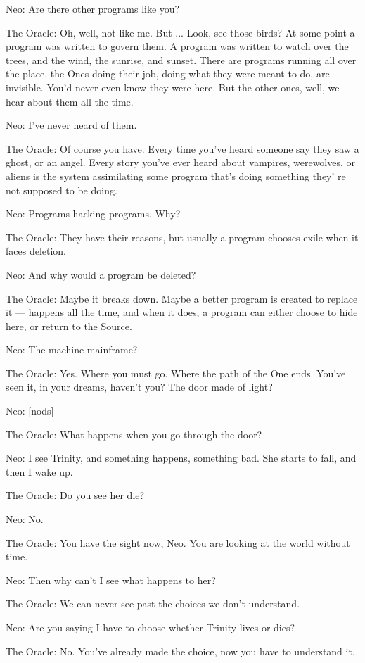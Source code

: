\documentclass[UTF8]{ctexart}
\newenvironment{myquote}{\color{green} \setlength{\leftskip}{6em} \setlength{\rightskip}{4em} \setlength{\parindent}{-2em}}{\par}
\begin{document}
\begin{myquote}
Neo: Are there other programs like you?

The Oracle: Oh, well, not like me. But ... Look, see those birds? At some point a program was written to govern them. A program was written to watch over the trees, and the wind, the sunrise, and sunset. There are programs running all over the place. the Ones doing their job, doing what they were meant to do, are invisible. You'd never even know they were here. But the other ones, well, we hear about them all the time.

Neo: I've never heard of them.

The Oracle: Of course you have. Every time you've heard someone say they saw a ghost, or an angel. Every story you've ever heard about vampires, werewolves, or aliens is the system assimilating some program that's doing something they' re not supposed to be doing.

Neo: Programs hacking programs. Why?

The Oracle: They have their reasons, but usually a program chooses exile when it faces deletion.

Neo: And why would a program be deleted?

The Oracle: Maybe it breaks down. Maybe a better program is created to replace it --- happens all the time, and when it does, a program can either choose to hide here, or return to the Source.

Neo: The machine mainframe?

The Oracle: Yes. Where you must go. Where the path of the One ends. You've seen it, in your dreams, haven't you? The door made of light?

Neo: [nods]

The Oracle: What happens when you go through the door?

Neo: I see Trinity, and something happens, something bad. She starts to fall, and then I wake up.

The Oracle: Do you see her die?

Neo: No.

The Oracle: You have the sight now, Neo. You are looking at the world without time.

Neo: Then why can't I see what happens to her?

The Oracle: We can never see past the choices we don't understand.

Neo: Are you saying I have to choose whether Trinity lives or dies?

The Oracle: No. You've already made the choice, now you have to understand it.


\end{myquote}
\end{document}
